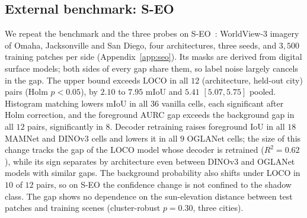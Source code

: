 \subsection{External benchmark: S-EO}
\label{sec:seo}

We repeat the benchmark and the three probes on S-EO~\cite{seo}: WorldView-3 imagery of Omaha, Jacksonville and San Diego, four architectures, three seeds, and $3{,}500$ training patches per side (Appendix~\ref{app:seo}). Its masks are derived from digital surface models; both sides of every gap share them, so label noise largely cancels in the gap. The upper bound exceeds LOCO in all $12$ (architecture, held-out city) pairs (Holm $p < 0.05$), by $2.10$ to $7.95$ mIoU and $5.41$ $[5.07, 5.75]$ pooled. Histogram matching lowers mIoU in all $36$ vanilla cells, each significant after Holm correction, and the foreground AURC gap exceeds the background gap in all $12$ pairs, significantly in $8$. Decoder retraining raises foreground IoU in all $18$ MAMNet and DINOv3 cells and lowers it in all $9$ OGLANet cells; the size of this change tracks the gap of the LOCO model whose decoder is retrained ($R^2 = 0.62$), while its sign separates by architecture even between DINOv3 and OGLANet models with similar gaps. The background probability also shifts under LOCO in $10$ of $12$ pairs, so on S-EO the confidence change is not confined to the shadow class. The gap shows no dependence on the sun-elevation distance between test patches and training scenes (cluster-robust $p = 0.30$, three cities).

